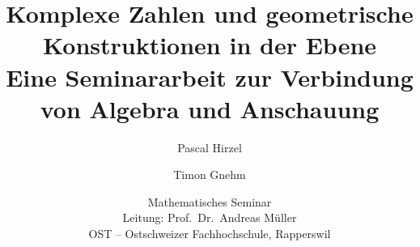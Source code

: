 \documentclass[11pt,a4paper]{article}
\title{Komplexe Zahlen und geometrische Konstruktionen
in der Ebene\\[2mm]
\large Eine Seminararbeit zur Verbindung von Algebra und Anschauung}
\author{Pascal Hirzel \and Timon Gnehm}
\date{Mathematisches Seminar\\
Leitung: Prof.\ Dr.\ Andreas Müller\\
OST -- Ostschweizer Fachhochschule, Rapperswil}
\renewcommand{\refname}{Literaturverzeichnis}
\theoremstyle{plain}
\begin{document}
\maketitle
\tableofcontents
\bigskip










\renewcommand{\refname}{Literaturverzeichnis}


\end{document}
